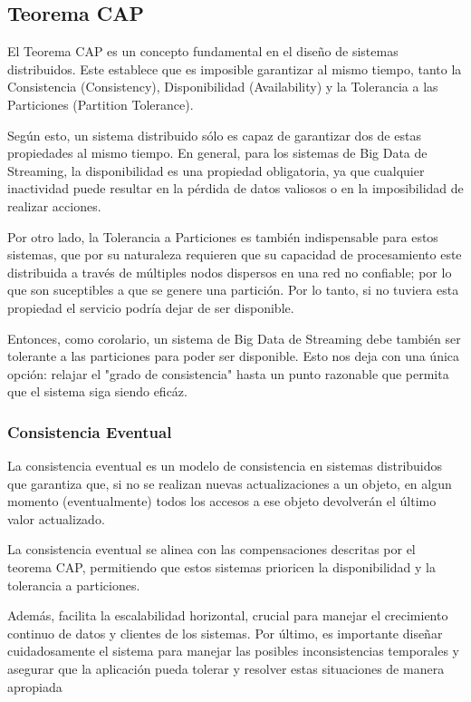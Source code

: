 \subsection{Teorema CAP}
El Teorema CAP es un concepto fundamental en el diseño de sistemas distribuidos. 
Este establece que es imposible garantizar al mismo tiempo, tanto la Consistencia (Consistency), 
Disponibilidad (Availability) y la Tolerancia a las Particiones (Partition Tolerance).\newline

Según esto, un sistema distribuido sólo es capaz de garantizar dos de estas propiedades al mismo tiempo. 
En general, para los sistemas de Big Data de Streaming, la disponibilidad es una propiedad obligatoria, ya que cualquier inactividad puede 
resultar en la pérdida de datos valiosos o en la imposibilidad de realizar acciones.\newline

Por otro lado, la Tolerancia a Particiones es también indispensable para estos sistemas, que por su naturaleza requieren que su capacidad de 
procesamiento este distribuida a través de múltiples nodos dispersos en una red no confiable; por lo que son suceptibles 
a que se genere una partición. Por lo tanto, si no tuviera esta propiedad el servicio podría dejar de ser disponible.\newline 

Entonces, como corolario, un sistema de Big Data de Streaming debe también ser tolerante a las particiones para poder ser disponible.
Esto nos deja con una única opción: relajar el "grado de consistencia" hasta un punto razonable que permita que el sistema siga siendo eficáz.\parencite{capteo}
\newpage
\subsubsection{Consistencia Eventual}
La consistencia eventual es un modelo de consistencia en sistemas distribuidos que garantiza que, 
si no se realizan nuevas actualizaciones a un objeto, en algun momento (eventualmente) todos los accesos a ese objeto 
devolverán el último valor actualizado. \newline

La consistencia eventual se alinea con las compensaciones descritas por el teorema CAP, 
permitiendo que estos sistemas prioricen la disponibilidad y la tolerancia a particiones. \newline

Además, facilita la escalabilidad horizontal, crucial para manejar el crecimiento continuo de datos y clientes de los sistemas.
Por último, es importante diseñar cuidadosamente el sistema para manejar las posibles inconsistencias temporales 
y asegurar que la aplicación pueda tolerar y resolver estas situaciones de manera apropiada \parencite{capteo}

